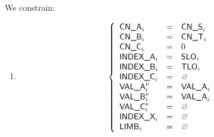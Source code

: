 \begin{center}
\end{center}

We constrain:
\begin{enumerate}
	\item 
		\[
			\left\{ \begin{array}{lclr}
				\cnA      _{i}       & = & \cnS_{i}     \\
				\cnB      _{i}       & = & \cnT_{i}     \\
				\cnC      _{i}       & = & 0            \\
				\indexA   _{i}       & = & \slo_{i}     \\
				\indexB   _{i}       & = & \tlo_{i}     \\
				\indexC   _{i}       & = & \nothing     \\
				\valA     _{i}\new{} & = & \valA_{i}    \\
				\valB     _{i}\new{} & = & \valA_{i}    \\
				\valC     _{i}\new{} & = & \nothing     \\
				\indexX   _{i}       & = & \nothing     \\
				\limb     _{i}       & = & \nothing     \\
			\end{array} \right.
		\]
\end{enumerate}
